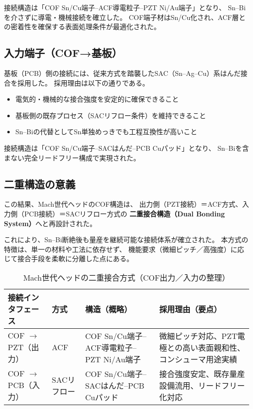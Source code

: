 \documentclass[conference]{IEEEtran}
\begin{document}
接続構造は「COF Sn/Cu端子–ACF導電粒子–PZT Ni/Au端子」となり、  
Sn–Biを介さずに導電・機械接続を確立した。  
COF端子材はSn/Cu化され、ACF層との密着性を確保する表面処理条件が最適化された。

\subsection{入力端子（COF→基板）}
基板（PCB）側の接続には、従来方式を踏襲したSAC（Sn–Ag–Cu）系はんだ接合を採用した。  
採用理由は以下の通りである。

\begin{itemize}
  \item 電気的・機械的な接合強度を安定的に確保できること  
  \item 基板側の既存プロセス（SACリフロー条件）を維持できること  
  \item Sn–Biの代替としてSn単独めっきでも工程互換性が高いこと
\end{itemize}

接続構造は「COF Sn/Cu端子–SACはんだ–PCB Cuパッド」となり、  
Sn–Biを含まない完全リードフリー構成で実現された。

\subsection{二重構造の意義}
この結果、Mach世代ヘッドのCOF構造は、  
出力側（PZT接続）＝ACF方式、入力側（PCB接続）＝SACリフロー方式の  
\textbf{二重接合構造（Dual Bonding System）}へと再設計された。  

これにより、Sn–Bi断絶後も量産を継続可能な接続体系が確立された。  
本方式の特徴は、単一の材料や工法に依存せず、  
機能要求（微細ピッチ／高強度）に応じて接合手段を柔軟に分離した点にある。  

\begin{table}[t]
\centering
\footnotesize
\caption{Mach世代ヘッドの二重接合方式（COF出力／入力の整理）}
\label{tab:dual-bond}
\renewcommand{\arraystretch}{1.1}
\begin{tabularx}{\columnwidth}{@{}p{2.1cm} p{1.2cm} Y Y@{}}
\toprule
接続インタフェース & 方式 & 構造（概略） & 採用理由（要点） \\
\midrule
COF $\rightarrow$ PZT（出力） & ACF &
COF Sn/Cu端子–ACF導電粒子–PZT Ni/Au端子 &
微細ピッチ対応、PZT電極との高い表面親和性、コンシューマ用途実績 \\
\addlinespace[2pt]
COF $\rightarrow$ PCB（入力） & SACリフロー &
COF Sn/Cu端子–SACはんだ–PCB Cuパッド &
接合強度安定、既存量産設備流用、リードフリー化対応 \\
\bottomrule
\end{tabularx}
\end{table}
\end{document}
